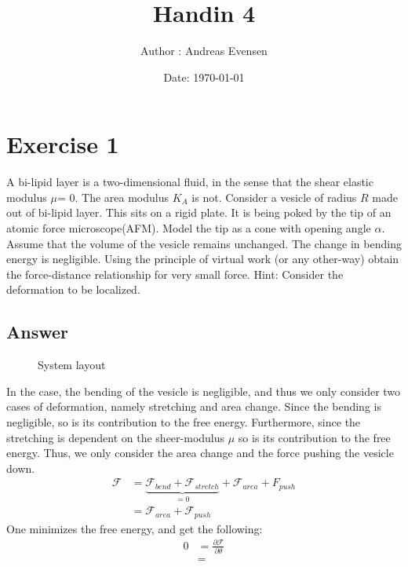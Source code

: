 \documentclass[a4paper]{article}
\title{Handin 4}
\author{Author : Andreas Evensen}
\date{Date: \today}
\newcommand{\F}{\mathcal{F}}
\begin{document}
\maketitle

\section*{Exercise 1}
A bi-lipid layer is a two-dimensional fluid, in the sense that the shear elastic modulus $\mu$= 0.
The area modulus $K_A$ is not. Consider a vesicle of radius $R$ made out of bi-lipid layer. This sits on a rigid plate.
It is being poked by the tip of an atomic force microscope(AFM). Model the tip as a cone with opening angle $\alpha$. 
Assume that the volume of the vesicle remains unchanged. The change in bending energy is negligible.
Using the principle of virtual work (or any other-way) obtain the force-distance relationship for very small force. Hint: Consider the deformation to be localized.

\subsection*{Answer}
\begin{figure}[H]
    \centering
    \caption*{System layout}
\end{figure}\noindent
In the case, the bending of the vesicle is negligible, and thus we only consider two cases of deformation, namely stretching and area change. Since the bending is negligible, so is its contribution to the free energy.
Furthermore, since the stretching is dependent on the sheer-modulus $\mu$ so is its contribution to the free energy. Thus, we only consider the area change and the force pushing the vesicle down.
\begin{align*}
    \F &= \underbrace{\F_{bend} + \F_{stretch}}_{=0} + \F_{area} + F_{push}\\
    &= \F_{area} + \F_{push}
\end{align*}One minimizes the free energy, and get the following:
\begin{align*}
    0 &= \frac{\partial \F}{\partial \theta}\\
    &=
\end{align*}
\end{document}
